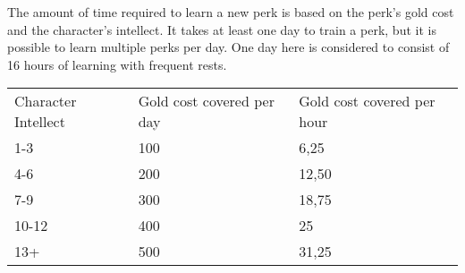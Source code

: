 The amount of time required to learn a new perk is based on the perk's gold cost and the character's intellect. It takes at least one day to train a perk, but it is possible to learn multiple perks per day. One day here is considered to consist of 16 hours of learning with frequent rests.\\

\begin{tabular}{l | l | l}
	Character Intellect & Gold cost covered per day & Gold cost covered per hour\\
	1-3 & 100 & 6,25\\
	4-6 & 200 & 12,50\\
	7-9 & 300 & 18,75\\
	10-12 & 400 & 25\\
	13+ & 500 & 31,25
\end{tabular}